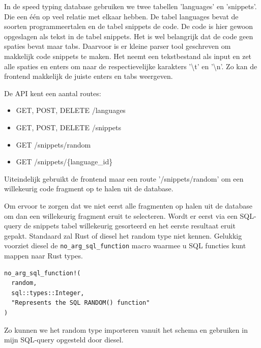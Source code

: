 In de speed typing database gebruiken we twee tabellen 'languages' en 'snippets'. Die een één op
veel relatie met elkaar hebben. De tabel languages bevat de soorten programmeertalen en de tabel
snippets de code. De code is hier gewoon opgeslagen als tekst in de tabel snippets. Het is wel
belangrijk dat de code geen spaties bevat maar tabs. Daarvoor is er kleine parser tool geschreven om
makkelijk code snippets te maken. Het neemt een tekstbestand als input en zet alle spaties en enters
om naar de respectievelijke karakters '\textbackslash t' en '\textbackslash n'. Zo kan de frontend
makkelijk de juiste enters en tabs weergeven. 

De API kent een aantal routes:
\begin{itemize}
    \item GET, POST, DELETE  /languages
    \item GET, POST, DELETE /snippets 
    \item GET /snippets/random 
    \item GET /snippets/\{language\_id\}
\end{itemize}

Uiteindelijk gebruikt de frontend maar een route '/snippets/random' om een willekeurig code fragment
op te halen uit de database. 

Om ervoor te zorgen dat we niet eerst alle fragmenten op halen uit de database om dan een willekeurig
fragment eruit te selecteren. Wordt er eerst via een SQL-query de snippets tabel willekeurig gesorteerd
en het eerste resultaat eruit gepakt. Standaard zal Rust of diesel het random type niet kennen.
Gelukkig voorziet diesel de \texttt{no_arg_sql_function} macro waarmee u SQL functies kunt
mappen naar Rust types.

\begin{listing}[h]
\begin{verbatim}
no_arg_sql_function!(
  random,
  sql::types::Integer,
  "Represents the SQL RANDOM() function"
)
\end{verbatim}
\end{listing}

Zo kunnen we het random type importeren vanuit het schema en gebruiken in mijn SQL-query opgesteld
door diesel.
